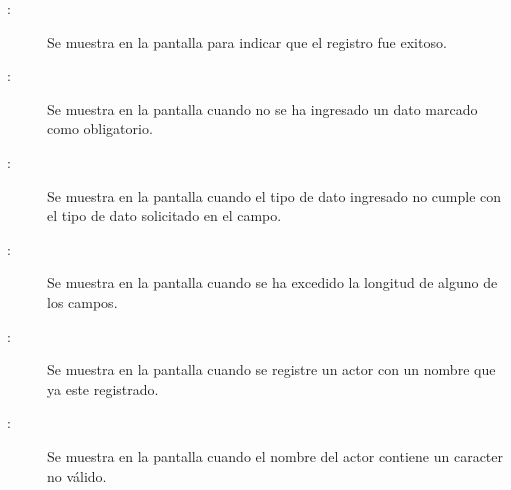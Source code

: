 	
\begin{description}
	\item[:] Se muestra en la pantalla  para indicar que el registro fue exitoso.
	\item[:] Se muestra en la pantalla  cuando no se ha ingresado un dato marcado como obligatorio.
	\item[:] Se muestra en la pantalla  cuando el tipo de dato ingresado no cumple con el tipo de dato solicitado en el campo.
	\item[:] Se muestra en la pantalla  cuando se ha excedido la longitud de alguno de los campos.
	\item[:] Se muestra en la pantalla  cuando se registre un actor con un nombre que ya este registrado.
	\item[:] Se muestra en la pantalla  cuando el nombre del actor contiene un caracter no válido.
\end{description}
